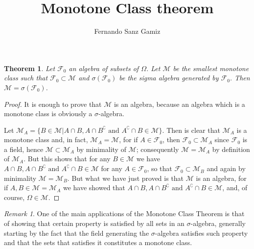 \documentclass[12pt]{article}
\newtheorem*{thm}{Theorem}
\theoremstyle{remark}
\newtheorem{rem}{Remark}
\numberwithin{equation}{section}
\newcommand{\M}{\mathcal{M}}
\newcommand{\F}{\mathcal{F}}
\begin{document}
\title{Monotone Class theorem}%
\author{Fernando Sanz Gamiz}%

\begin{thm}
Let $\F_0$ an algebra of subsets of $\Omega$. Let $\M$ be the
smallest monotone class such that $\F_0 \subset \M$ and
$\sigma(\F_0)$ be the sigma algebra generated by $\F_0$. Then
$\M=\sigma(\F_0)$.
\end{thm}

\bigskip

\begin{proof}
It is enough to prove that $\M$ is an algebra, because an algebra
which is a monotone class is obviously a $\sigma$-algebra.

Let $\M_A=\{B \in \M |A \cap B, A \cap B^\complement \mbox{ and } A^\complement \cap B
\in \M \}$. Then is clear that $\M_A$ is a monotone class and, in
fact, $\M_A=\M$, for if $A \in \F_0$, then $\F_0 \subset \M_A$ since
$\F_0$ is a field, hence  $\M \subset \M_A$ by minimality of $\M$;
consequently $\M=\M_A$ by definition of $\M_A$. But this shows that
for any $B \in \M$ we have $A \cap B, A \cap B^\complement \mbox{ and } A^\complement
\cap B \in \M$ for any $A \in \F_0$, so that $\F_0 \subset \M_B$ and
again by minimality $\M=\M_B$. But what we have just proved is that
$\M$ is an algebra, for if $A,B \in \M=\M_A$ we have showed that $A
\cap B, A \cap B^\complement \mbox{ and } A^\complement \cap B \in \M$, and, of course,
$\Omega \in \M$.
\end{proof}

\bigskip

\begin{rem}
One of the main applications of the Monotone Class Theorem is that
of showing that certain property is satisfied by all sets in an
$\sigma$-algebra, generally starting by the fact that the field
generating the $\sigma$-algebra satisfies such property and that the
sets that satisfies it constitutes a monotone class.
\end{rem}

\bigskip
\end{document}
